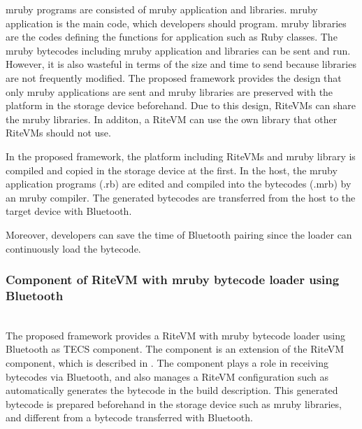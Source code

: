 \documentclass[conference,compsoc]{IEEEtran}
\begin{document}
mruby programs are consisted of mruby application and libraries.
mruby application is the main code, which developers should program.
mruby libraries are the codes defining the functions for application such as Ruby classes. 
The mruby bytecodes including mruby application and libraries can be sent and run.
However, it is also wasteful in terms of the size and time to send because libraries are not frequently modified. 
The proposed framework provides the design that only mruby applications are sent and mruby libraries are preserved with the platform in the storage device beforehand.
Due to this design, RiteVMs can share the mruby libraries.
In additon, a RiteVM can use the own library that other RiteVMs should not use.

In the proposed framework, the platform including RiteVMs and mruby library is compiled and copied in the storage device at the first.
In the host, the mruby application programs (.rb) are edited and compiled into the bytecodes (.mrb) by an mruby compiler.
The generated bytecodes are transferred from the host to the target device with Bluetooth.

Moreover, developers can save the time of Bluetooth pairing since the loader can continuously load the bytecode.


\subsubsection{Component of RiteVM with mruby bytecode loader using Bluetooth} \mbox{}\\

The proposed framework provides a RiteVM with mruby bytecode loader using Bluetooth as TECS component.
The component is an extension of the RiteVM component, which is described in \cite{par:mrubyonTECS}.
The component plays a role in receiving bytecodes via Bluetooth, and also manages a RiteVM configuration such as automatically generates the bytecode in the build description.
This generated bytecode is prepared beforehand in the storage device such as mruby libraries, and different from a bytecode transferred with Bluetooth.
\end{document}
